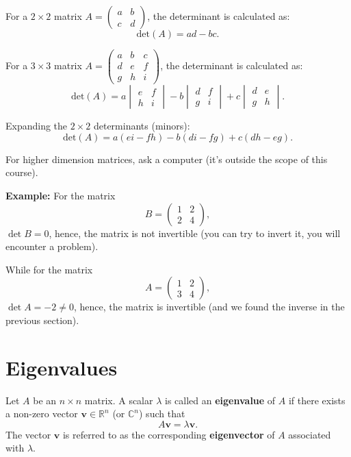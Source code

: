 \documentclass[]{article}
\begin{document}
	For a $2 \times 2$ matrix $A = \begin{pmatrix} a & b \\ c & d \end{pmatrix}$, the determinant is calculated as:
	$$
	\text{det}(A) = ad - bc.
	$$
	
	For a $3 \times 3$ matrix $A = \begin{pmatrix} a & b & c \\ d & e & f \\ g & h & i \end{pmatrix} $, the determinant is calculated as:
	$$
	\text{det}(A) =
	  a \begin{vmatrix} e & f \\ h & i \end{vmatrix}
	- b \begin{vmatrix} d & f \\ g & i \end{vmatrix}
	+ c \begin{vmatrix} d & e \\ g & h \end{vmatrix}.
	$$
	
	Expanding the $2 \times 2$ determinants (minors):
	$$
	\text{det}(A) = a(ei - fh) - b(di - fg) + c(dh - eg).
	$$
	
	For higher dimension matrices, ask a computer (it's outside the scope of this course).
	
	\noindent \textbf{Example:} For the matrix
	$$
	B = \begin{pmatrix} 1 & 2 \\ 2 & 4 \end{pmatrix},
	$$
	$\det{B} = 0$, hence, the matrix is not invertible (you can try to invert it, you will encounter a problem).
	
	While for the matrix
	$$
	A = \begin{pmatrix} 1 & 2 \\ 3 & 4 \end{pmatrix},
	$$
	$\det{A} = -2 \neq 0$, hence, the matrix is invertible (and we found the inverse in the previous section).
		
	\section{Eigenvalues}
	
	Let $A$ be an $n \times n$ matrix.
	A scalar $\lambda$ is called an \textbf{eigenvalue} of $A$ if there exists a non-zero vector $\mathbf{v} \in \mathbb{R}^n$ (or $\mathbb{C}^n$) such that
	$$
	A \mathbf{v} = \lambda \mathbf{v}.
	$$
	The vector $\mathbf{v}$ is referred to as the corresponding \textbf{eigenvector} of $A$ associated with $\lambda$.
	
\end{document}
